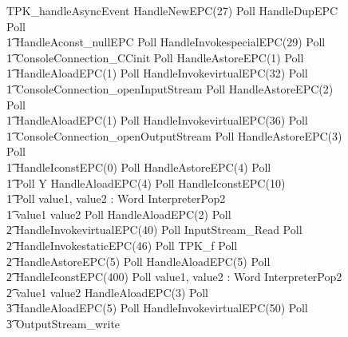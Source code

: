 \begin{figure}
  \begin{circus}
    TPK\_handleAsyncEvent \circdef HandleNewEPC(27) \circseq Poll \circseq HandleDupEPC \circseq Poll \circseq \\
    \t1 HandleAconst\_nullEPC \circseq Poll \circseq HandleInvokespecialEPC(29) \circseq Poll \circseq \\
    \t1 ConsoleConnection\_CCinit \circseq Poll \circseq HandleAstoreEPC(1) \circseq Poll \circseq \\
    \t1 HandleAloadEPC(1) \circseq Poll \circseq HandleInvokevirtualEPC(32) \circseq Poll \circseq \\
    \t1 ConsoleConnection\_openInputStream \circseq Poll \circseq  HandleAstoreEPC(2) \circseq Poll \circseq \\
    \t1 HandleAloadEPC(1) \circseq Poll \circseq HandleInvokevirtualEPC(36) \circseq Poll \circseq \\
    \t1 ConsoleConnection\_openOutputStream \circseq Poll \circseq HandleAstoreEPC(3) \circseq Poll \circseq \\
    \t1 HandleIconstEPC(0) \circseq Poll \circseq HandleAstoreEPC(4) \circseq Poll \circseq \\
    \t1 Poll \circseq\circmu Y \circspot HandleAloadEPC(4) \circseq Poll \circseq HandleIconstEPC(10) \circseq \\
    \t1 Poll \circseq \circvar value1, value2 : Word \circspot InterpreterPop2 \circseq \\
    \t1 \circif value1 \leq value2 \circseq Poll \circseq HandleAloadEPC(2) \circseq Poll \circseq \\
    \t2 HandleInvokevirtualEPC(40) \circseq Poll \circseq InputStream\_Read \circseq Poll \circseq \\
    \t2 HandleInvokestaticEPC(46) \circseq Poll \circseq TPK\_f  \circseq Poll \circseq \\
    \t2 HandleAstoreEPC(5) \circseq Poll \circseq HandleAloadEPC(5) \circseq Poll \circseq \\
    \t2 HandleIconstEPC(400) \circseq Poll \circseq \circvar value1, value2 : Word \circspot InterpreterPop2 \circseq \\
    \t2 \circif value1 \leq value2 \circthen HandleAloadEPC(3) \circseq Poll \circseq \\
    \t3 HandleAloadEPC(5) \circseq Poll \circseq HandleInvokevirtualEPC(50) \circseq Poll \circseq \\
    \t3 OutputStream\_write \\

\end{circus}
\end{figure}

